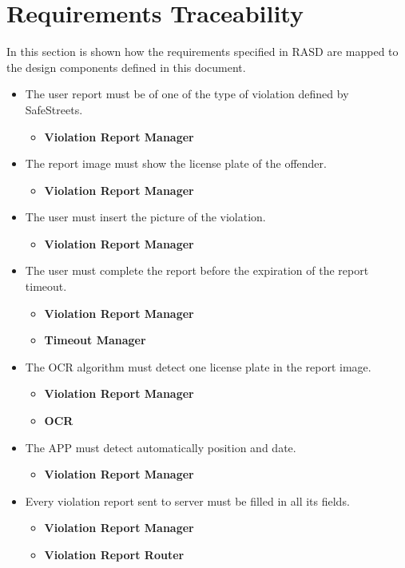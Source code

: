 \documentclass{article}
\newcommand\requirement[1]{\item[{[R#1]}] }
\begin{document}
	\clearpage	
	\section{Requirements Traceability}
		In this section is shown how the requirements specified in RASD are mapped
		to the design components defined in this document.
		\begin{itemize}
			\requirement{1} The user report must be of one of the type of violation defined by SafeStreets.
			\begin{itemize}
				\item \textbf{Violation Report Manager}
			\end{itemize}
			\requirement{2} The report image must show the license plate of the offender.
			\begin{itemize}
				\item \textbf{Violation Report Manager}
			\end{itemize}
			\requirement{3} The user must insert the picture of the violation.
			\begin{itemize}
				\item \textbf{Violation Report Manager} 
			\end{itemize}
			\requirement{4} The user must complete the report before the expiration of the report timeout.
			\begin{itemize}
				\item \textbf{Violation Report Manager}
				\item \textbf{Timeout Manager}
			\end{itemize}
			\requirement{5} The OCR algorithm must detect one license plate in the report image.	
			\begin{itemize}
				\item \textbf{Violation Report Manager}
				\item \textbf{OCR}
			\end{itemize}
			\requirement{6} The APP must detect automatically position and date.
			\begin{itemize}
				\item \textbf{Violation Report Manager}
			\end{itemize}
			\requirement{7} Every violation report sent to server must be filled in all its fields.
			\begin{itemize}
				\item \textbf{Violation Report Manager}
				\item \textbf{Violation Report Router}
			\end{itemize}

\end{itemize}
\end{document}

